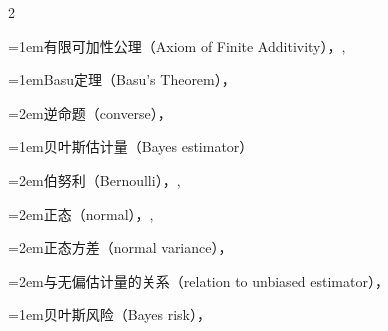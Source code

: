 \begin{multicols}{2}
\par\addvspace{2pt}
\par\noindent\hangindent=1em\hspace*{0em}\label{idx:75}有限可加性公理（Axiom of Finite Additivity），\hyperref[idxocc:75:39]{\pageref*{idxocc:75:39}}, \hyperref[exercise:1.12]{\pageref*{exercise:1.12}}\par
\par\addvspace{2pt}
\par\noindent\hangindent=1em\hspace*{0em}\label{idx:76}Basu定理（Basu’s Theorem），\hyperref[thm:6.2.24]{\pageref*{thm:6.2.24}}\par
\par\noindent\hangindent=2em\hspace*{1em}\label{idx:77}逆命题（converse），\hyperref[sec:6.6.1]{\pageref*{sec:6.6.1}}\par
\par\addvspace{2pt}
\par\noindent\hangindent=1em\hspace*{0em}\label{idx:78}贝叶斯估计量（Bayes estimator）\par
\par\noindent\hangindent=2em\hspace*{1em}\label{idx:79}伯努利（Bernoulli），\hyperref[ex:7.2.14]{\pageref*{ex:7.2.14}}, \hyperref[ex:7.3.5]{\pageref*{ex:7.3.5}}\par
\par\noindent\hangindent=2em\hspace*{1em}\label{idx:80}正态（normal），\hyperref[ex:7.2.16]{\pageref*{ex:7.2.16}}, \hyperref[exercise:7.22]{\pageref*{exercise:7.22}}\par
\par\noindent\hangindent=2em\hspace*{1em}\label{idx:81}正态方差（normal variance），\hyperref[exercise:7.23]{\pageref*{exercise:7.23}}\par
\par\noindent\hangindent=2em\hspace*{1em}\label{idx:82}与无偏估计量的关系（relation to unbiased estimator），\hyperref[sec:7.5.2]{\pageref*{sec:7.5.2}}\par
\par\addvspace{2pt}
\par\noindent\hangindent=1em\hspace*{0em}\label{idx:83}贝叶斯风险（Bayes risk），\hyperref[idxocc:83:316]{\pageref*{idxocc:83:316}}\par

\end{multicols}
